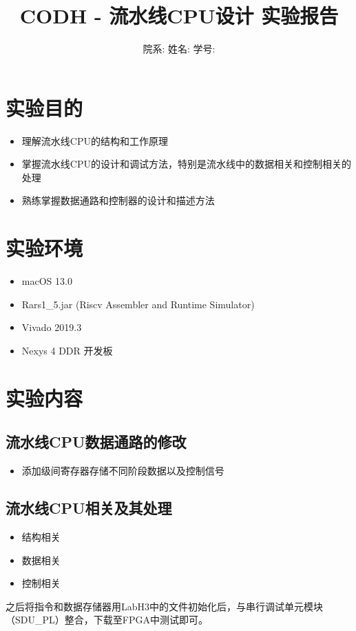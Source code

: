 \documentclass[a4paper]{article}
\title{\heiti 
CODH - 流水线CPU设计 \hspace{0.3cm}实验报告}
\author{院系: \kaishu\underline{}\hspace{1.5cm}姓名: \kaishu \underline{}\hspace{1.5cm}学号: \kaishu \underline{}\hspace{1.5cm}}
\begin{document}
\maketitle

\section{实验目的}
\begin{itemize}
    \item 理解流水线CPU的结构和工作原理
    \item 掌握流水线CPU的设计和调试方法，特别是流水线中的数据相关和控制相关的处理
    \item 熟练掌握数据通路和控制器的设计和描述方法
\end{itemize}

\section{实验环境}
\begin{itemize}
  \item macOS 13.0
  \item Rars1\_5.jar (Riscv Assembler and Runtime Simulator)
  \item Vivado 2019.3
  \item Nexys 4 DDR 开发板
\end{itemize}
\section{实验内容}
\subsection{流水线CPU数据通路的修改}
\begin{itemize}
    \item 添加级间寄存器存储不同阶段数据以及控制信号

  \end{itemize}

  \subsection{流水线CPU相关及其处理}
  \begin{itemize}
    \item 结构相关
    \item 数据相关
    \item 控制相关
  \end{itemize}
之后将指令和数据存储器用LabH3中的文件初始化后，与串行调试单元模块（SDU\_PL）整合，下载至FPGA中测试即可。
\end{document}

